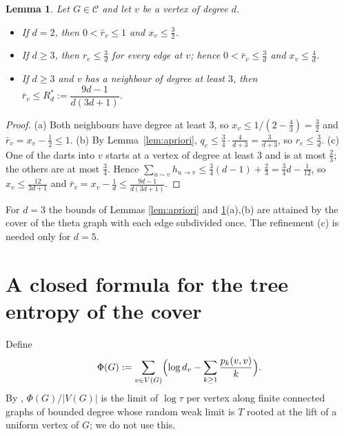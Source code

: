 \documentclass[11pt]{amsart}
\theoremstyle{plain}
\newtheorem{lemma}[theorem]{Lemma}
\theoremstyle{remark}
\newcommand{\cC}{\mathcal{C}}
\newcommand{\rb}{\bar r}
\begin{document}
\begin{lemma}\label{lem:ranges}
Let $G\in\cC$ and let $v$ be a vertex of degree $d$.
\begin{itemize}
\item[(a)] If $d=2$, then $0<\rb_v\le1$ and $x_v\le\frac32$.
\item[(b)] If $d\ge3$, then $r_e\le\frac3d$ for every edge at $v$; hence $0<\rb_v\le\frac3d$ and $x_v\le\frac4d$.
\item[(c)] If $d\ge3$ and $v$ has a neighbour of degree at least $3$, then
 $\rb_v\le R^*_d:=\dfrac{9d-1}{d(3d+1)}$.
\end{itemize}
\end{lemma}
\begin{proof}
(a) Both neighbours have degree at least $3$, so $x_v\le1/(2-\frac43)=\frac32$ and $\rb_v=x_v-\frac12\le1$.
(b) By Lemma~\ref{lem:apriori}, $q_e\le\frac34\cdot\frac4{d+3}=\frac3{d+3}$, so $r_e\le\frac3d$.
(c) One of the darts into $v$ starts at a vertex of degree at least $3$ and is at most $\frac23$; the others are at
most $\frac34$. Hence $\sum_{u\sim v}h_{u\to v}\le\frac34(d-1)+\frac23=\frac34d-\frac1{12}$, so
$x_v\le\frac{12}{3d+1}$ and $\rb_v=x_v-\frac1d\le\frac{9d-1}{d(3d+1)}$.
\end{proof}
For $d=3$ the bounds of Lemmas \ref{lem:apriori} and \ref{lem:ranges}(a),(b) are attained by the cover of the theta
graph with each edge subdivided once. The refinement (c) is needed only for $d=5$.

\section{A closed formula for the tree entropy of the cover}\label{sec:formula}

Define
\[
 \Phi(G):=\sum_{v\in V(G)}\Bigl(\log d_v-\sum_{k\ge1}\frac{p_k(v,v)}{k}\Bigr).
\]
By \cite{Lyons}, $\Phi(G)/|V(G)|$ is the limit of $\log\tau$ per vertex along finite connected graphs of bounded
degree whose random weak limit is $T$ rooted at the lift of a uniform vertex of $G$; we do not use this.
\end{document}
